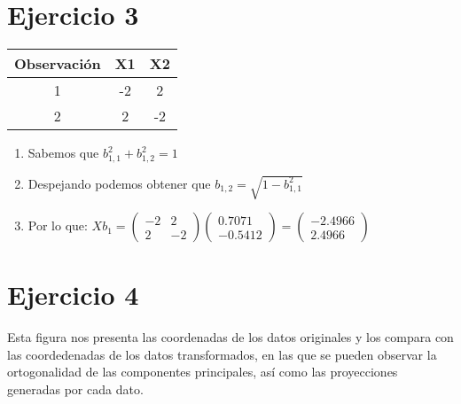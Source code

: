 \documentclass{article}
\begin{document}
\newpage

\section{Ejercicio 3}

\begin{table}[htbp]
  \centering
    \begin{tabular}{|c|c|c|}
        \hline
        Observación & X1 & X2 \\
        \hline
        1 & -2 & 2\\
        \hline
        2 & 2 & -2 \\
        \hline
    \end{tabular}
\end{table}

\begin{enumerate}
	\item Sabemos que $b_{1,1}^{2}+b_{1,2}^{2}=1$
	\item Despejando podemos obtener que $b_{1,2}=\sqrt{1-b_{1,1}^{2}}$
	\item Por lo que:
	 $Xb_{1} = \begin{pmatrix}
-2&2 \\
2&-2
\end{pmatrix} 
\begin{pmatrix}
0.7071 \\
-0.5412
\end{pmatrix}=
\begin{pmatrix}
-2.4966 \\
2.4966
\end{pmatrix}$	
\end{enumerate}

\section{Ejercicio 4}
Esta figura nos presenta las coordenadas de los datos originales y los compara con las coordedenadas de los datos transformados, en las que se pueden observar la ortogonalidad de las componentes principales, así como las proyecciones generadas por cada dato.
\end{document}

